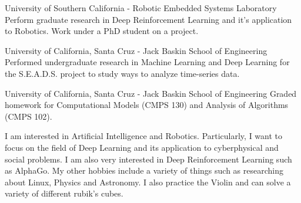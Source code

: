 \documentclass{resume}
\begin{document}

{University of Southern California - Robotic Embedded Systems Laboratory}
{Perform graduate research in Deep Reinforcement Learning and it's application
to Robotics. Work under a PhD student on a project.}

{University of California, Santa Cruz - Jack Baskin School of Engineering}
{Performed undergraduate research in Machine Learning and Deep Learning 
for the S.E.A.D.S. project to study ways to analyze time-series data.}

{University of California, Santa Cruz - Jack Baskin School of Engineering}
{Graded homework for Computational Models (CMPS 130) and Analysis of 
Algorithms (CMPS 102).}

I am interested in Artificial Intelligence and Robotics. Particularly,
I want to focus on the field of Deep Learning and its application to
cyberphysical and social problems. I am also very interested in 
Deep Reinforcement Learning such as AlphaGo. My other hobbies include a variety
of things such as researching about Linux, Physics and Astronomy. I
also practice the Violin and can solve a variety of different rubik's
cubes.
\end{document}
